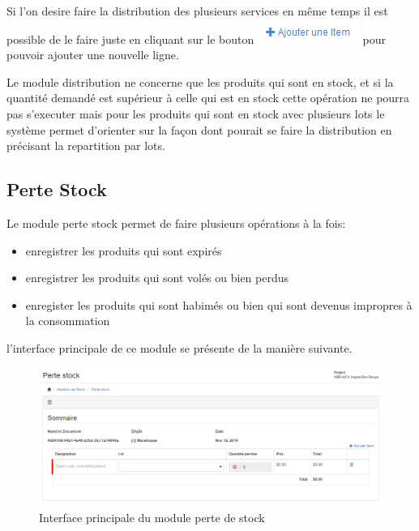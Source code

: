 \documentclass[12pt,a4paper]{report}
\begin{document}
Si l'on desire faire la distribution des plusieurs services en même temps il est possible de le faire juste en cliquant sur le bouton \includegraphics[scale=0.7]{pic/AjouterItem.png} pour pouvoir ajouter une nouvelle ligne.

Le module distribution ne concerne que les produits qui sont en stock, et si la quantité demandé est supérieur à celle qui est en stock cette opération ne pourra pas s'executer mais pour les produits qui sont en stock avec plusieurs lots le système permet d'orienter sur la façon dont pourait se faire la distribution en précisant la repartition par lots.

\newpage
\subsection{Perte Stock}
Le module perte stock permet de faire plusieurs opérations à la fois:

\begin{itemize}
\item enregistrer les produits qui sont expirés
\item enregistrer les produits qui sont volés ou bien perdus
\item enregister les produits qui sont habimés ou bien qui sont devenus impropres à la consommation
\end{itemize}

l'interface principale de ce module se présente de la manière suivante.

\begin{figure}[h]
\begin{center}
\includegraphics[width=14cm]{pic/PerteStock.png}
\end{center}
\caption{Interface principale du module perte de stock }
\label{Interface principale du module perte de stock }
\end{figure}
\end{document}
